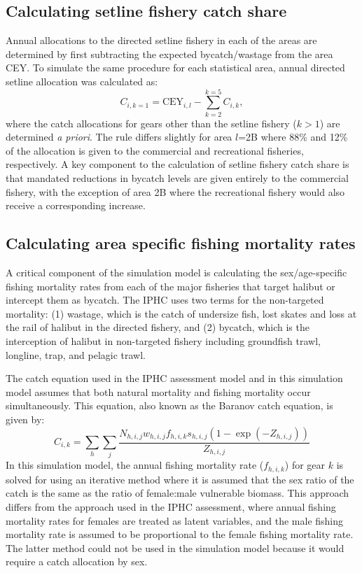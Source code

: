 \subsection{Calculating setline fishery catch share} %
\label{sub:calculating_setline_fishery_allocation}
Annual allocations to the directed setline fishery in each of the areas are determined by first subtracting the expected bycatch/wastage from the area CEY.  To simulate the same procedure for each statistical area, annual directed setline allocation was calculated as:
\[ C_{i,k=1} = \mathrm{CEY}_{i,l} - \sum_{k=2}^{k=5} C_{i,k}, \]
where the catch allocations for gears other than the setline fishery ($k>1$) are determined \emph{a priori}.  The rule differs slightly for area $l$=2B where 88\% and 12\% of the allocation is given to the commercial and recreational fisheries, respectively.  A key component to the calculation of setline fishery catch share is that mandated reductions in bycatch levels are given entirely to the commercial fishery, with the exception of area 2B where the recreational fishery would also receive a corresponding increase.


\subsection{Calculating area specific fishing mortality rates} %
\label{sub:calculating_area_specific_fishing_mortality_rates}
A critical component of the simulation model is calculating the sex/age-specific fishing mortality rates from each of the major fisheries that target halibut or intercept them as bycatch.  The IPHC uses two terms for the non-targeted mortality: (1) wastage, which is the catch of undersize fish, lost skates and loss at the rail of halibut in the directed fishery, and (2) bycatch, which is the interception of halibut in non-targeted fishery including groundfish trawl, longline, trap, and pelagic trawl.

The catch equation used in the IPHC assessment model and in this simulation model assumes that both natural mortality and fishing mortality occur simultaneously.  This equation, also known as the Baranov catch equation, is given by:
\[
 C_{i,k} =\sum_h \sum_j \frac{N_{h,i,j} w_{h,i,j} f_{h,i,k} s_{h,i,j} (1-\exp(-Z_{h,i,j}))}{Z_{h,i,j}}
\]
In this simulation model, the annual fishing mortality rate ($f_{h,i,k}$) for gear $k$ is solved for using an iterative method where it is assumed that the sex ratio of the catch is the same as the ratio of female:male vulnerable biomass.  This approach differs from the approach used in the IPHC assessment, where annual fishing mortality rates for females are treated as  latent variables, and the male fishing mortality rate is assumed to be proportional to the female fishing mortality rate.  The latter method could not be used in the simulation model  because it would require a catch allocation by sex.

